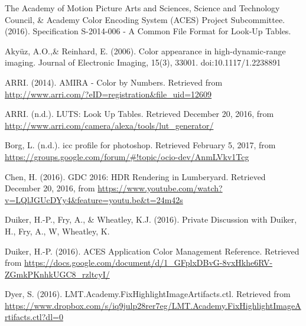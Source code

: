 \documentclass[conference]{IEEEtran}
\begin{document}
\begin{thebibliography}{1}
\renewcommand\@biblabel[1]{[Amp16]}
\bibitem{}
The Academy of Motion Picture Arts and Sciences, Science and Technology Council, & Academy Color Encoding System (ACES) Project Subcommittee. (2016). Specification S-2014-006 - A Common File Format for Look-Up Tables. \vspace{2mm}

\renewcommand\@biblabel[1]{[AR06]}
\bibitem{}
Akyüz, A.O.,\& Reinhard, E. (2006). Color appearance in high-dynamic-range imaging. Journal of Electronic Imaging, 15(3), 33001. doi:10.1117/1.2238891 \vspace{2mm}

\renewcommand\@biblabel[1]{[Arr14]}
\bibitem{}
ARRI. (2014). AMIRA - Color by Numbers. Retrieved from \url{http://www.arri.com/?eID=registration&file_uid=12609} \vspace{2mm}

\renewcommand\@biblabel[1]{[Arr16]}
\bibitem{}
ARRI. (n.d.). LUTS: Look Up Tables. Retrieved December 20, 2016, from \url{http://www.arri.com/camera/alexa/tools/lut_generator/} \vspace{2mm}

\renewcommand\@biblabel[1]{[Bor17]}
\bibitem{}
Borg, L. (n.d.). icc profile for photoshop. Retrieved February 5, 2017, from \url{https://groups.google.com/forum/#!topic/ocio-dev/AnmLVkv1Tcg} \vspace{2mm}

\renewcommand\@biblabel[1]{[Che16]}
\bibitem{}
Chen, H. (2016). GDC 2016: HDR Rendering in Lumberyard. Retrieved December 20, 2016, from \url{https://www.youtube.com/watch?v=LQlJGUcDYy4&feature=youtu.be&t=24m42s} \vspace{2mm}

\renewcommand\@biblabel[1]{[DFW16]}
\bibitem{}
Duiker, H.-P., Fry, A., \& Wheatley, K.J. (2016). Private Discussion with Duiker, H., Fry, A., W, Wheatley, K. \vspace{2mm}

\renewcommand\@biblabel[1]{[Dui16]}
\bibitem{}
Duiker, H.-P. (2016). ACES Application Color Management Reference. Retrieved from \url{https://docs.google.com/document/d/1_GFplxDBvG-8vxHkhe6RV-ZGmkPKnhkUGC8_rzltcyI/} \vspace{2mm}

\renewcommand\@biblabel[1]{[Dye16]}
\bibitem{}
Dyer, S. (2016). LMT.Academy.FixHighlightImageArtifacts.ctl. Retrieved from \url{https://www.dropbox.com/s/iq9julp28rer7eg/LMT.Academy.FixHighlightImageArtifacts.ctl?dl=0} \vspace{2mm}


\end{thebibliography}
\end{document}
